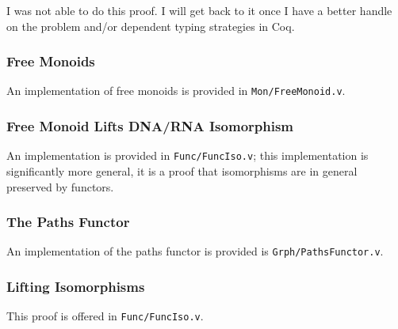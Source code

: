 \documentclass[12pt,twocolumn,oneside]{book}
\begin{document}
I was not able to do this proof. I will get back to it once I have a better handle
on the problem and/or dependent typing strategies in Coq.


\subsubsection{Free Monoids}

An implementation of free monoids is provided in \texttt{Mon/FreeMonoid.v}.

\subsubsection{Free Monoid Lifts DNA/RNA Isomorphism}

An implementation is provided in \texttt{Func/FuncIso.v}; this implementation is
significantly more general, it is a proof that isomorphisms are in general preserved
by functors.


\subsubsection{The Paths Functor}

An implementation of the paths functor is provided is \texttt{Grph/PathsFunctor.v}.

\subsubsection{Lifting Isomorphisms}

This proof is offered in \texttt{Func/FuncIso.v}.
\end{document}
